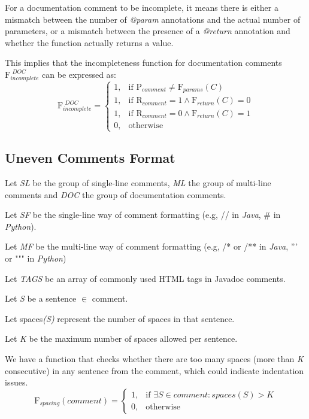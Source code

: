 \noindent For a documentation comment to be incomplete, it means there is either a mismatch between the number of \textit{@param} annotations and the actual number of parameters, or a mismatch between the presence of a \textit{@return} annotation and whether the function actually returns a value.

\noindent This implies that the incompleteness function for documentation comments $\mathrm{F}_{incomplete}^{\textit{ DOC}}$ can be expressed as:
\begin{equation*}
	\mathrm{F}_{incomplete}^{\textit{ DOC}} = \begin{cases}
		1, & \text{if } \mathrm{P}_{comment} \ne \mathrm{F}_{params}(C) \\
		1, & \text{if } \mathrm{R}_{comment} = 1 \wedge \mathrm{F}_{return}(C) = 0 \\
		1, & \text{if } \mathrm{R}_{comment} = 0 \wedge \mathrm{F}_{return}(C) = 1 \\
		0, & \text{otherwise}
	\end{cases}
\end{equation*}

\subsection{Uneven Comments Format}
Let \textit{SL} be the group of single-line comments, \textit{ML} the group of multi-line comments and \textit{DOC} the group of documentation comments.

\noindent Let \textit{SF} be the single-line way of comment formatting (e.g, // in \textit{Java}, # in \textit{Python}).

\noindent Let \textit{MF} be the multi-line way of comment formatting (e.g, /* or /** in \textit{Java}, ''' or """ in \textit{Python})

\noindent Let \textit{TAGS} be an array of commonly used HTML tags in Javadoc comments.

\noindent Let \textit{S} be a sentence $\in$ comment.

\noindent Let spaces\textit{(S)} represent the number of spaces in that sentence.

\noindent Let \textit{K} be the maximum number of spaces allowed per sentence.

\noindent We have a function that checks whether there are too many spaces (more than \textit{K} consecutive) in any sentence from the comment, which could indicate indentation issues.
\begin{equation*}
	\mathrm{F}_{spacing}(comment) = \begin{cases}
		1, & \text{if } \exists S \in comment : spaces(S) > K \\
		0, & \text{otherwise}
	\end{cases}
\end{equation*}

